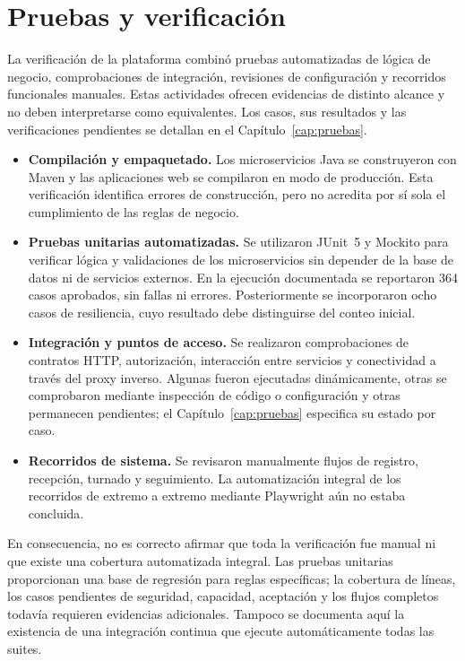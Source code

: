 \section{Pruebas y verificación}
\label{sec:pruebas}
La verificación de la plataforma combinó pruebas automatizadas de lógica de negocio,
comprobaciones de integración, revisiones de configuración y recorridos funcionales
manuales. Estas actividades ofrecen evidencias de distinto alcance y no deben
interpretarse como equivalentes. Los casos, sus resultados y las verificaciones
pendientes se detallan en el Capítulo~\ref{cap:pruebas}.

\begin{itemize}
    \item \textbf{Compilación y empaquetado.} Los microservicios Java se construyeron
    con Maven y las aplicaciones web se compilaron en modo de producción. Esta
    verificación identifica errores de construcción, pero no acredita por sí sola
    el cumplimiento de las reglas de negocio.
    \item \textbf{Pruebas unitarias automatizadas.} Se utilizaron JUnit~5 y Mockito
    para verificar lógica y validaciones de los microservicios sin depender de la
    base de datos ni de servicios externos. En la ejecución documentada se reportaron
    364 casos aprobados, sin fallas ni errores. Posteriormente se incorporaron
    ocho casos de resiliencia, cuyo resultado debe distinguirse del conteo inicial.
    \item \textbf{Integración y puntos de acceso.} Se realizaron comprobaciones
    de contratos HTTP, autorización, interacción entre servicios y conectividad a
    través del proxy inverso. Algunas fueron ejecutadas dinámicamente, otras se
    comprobaron mediante inspección de código o configuración y otras permanecen
    pendientes; el Capítulo~\ref{cap:pruebas} especifica su estado por caso.
    \item \textbf{Recorridos de sistema.} Se revisaron manualmente flujos de
    registro, recepción, turnado y seguimiento. La automatización integral de los
    recorridos de extremo a extremo mediante Playwright aún no estaba concluida.
\end{itemize}

En consecuencia, no es correcto afirmar que toda la verificación fue manual ni
que existe una cobertura automatizada integral. Las pruebas unitarias proporcionan
una base de regresión para reglas específicas; la cobertura de líneas, los casos
pendientes de seguridad, capacidad, aceptación y los flujos completos todavía
requieren evidencias adicionales. Tampoco se documenta aquí la existencia de una
integración continua que ejecute automáticamente todas las suites.

